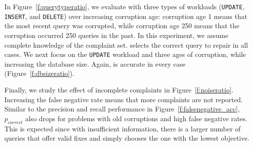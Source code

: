 In Figure~\ref{f:querytyperatio}, we evaluate \qfix with three types of
workloads (\texttt{UPDATE}, \texttt{INSERT}, and \texttt{DELETE}) over
increasing corruption age: corruption age 1 means that the most recent query
was corrupted, while corruption age 250 means that the corruption occurred 250
queries in the past. In this experiment, we assume complete knowledge of the
complaint set. \sys selects the correct query to repair in all cases. We next
focus on the \texttt{UPDATE} workload and three ages of corruption, while
increasing the database size. Again, \sys is accurate in every case
(Figure~\ref{f:dbsizeratio}).


Finally, we study the effect of incomplete complaints in
Figure~\ref{f:noiseratio}. Increasing the false negative rate means that more
complaints are not reported. Similar to the precision and recall performance
in Figure~\ref{f:falsenegative_acc}, $p_{correct}$ also drops for problems
with old corruptions and high false negative rates. This is expected since
with insufficient information, there is a larger number of queries that offer
valid fixes and \sys simply chooses the one with the lowest objective. 






% 
% 


